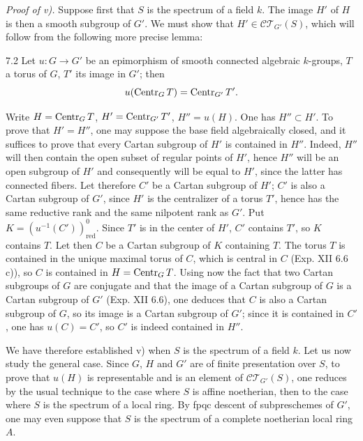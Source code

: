 \par\noindent\emph{Proof of v).}
Suppose first that $S$ is the spectrum of a field $k$. The image $H'$ of $H$ is then a smooth subgroup of $G'$. We must show that $H'\in\mathscr{CT}_{G'}(S)$, which will follow from the following more precise lemma:
\begin{lemma}{7.2}\label{XV.7.2}
Let $u:G\to G'$ be an epimorphism of smooth connected algebraic $k$-groups, $T$ a torus of $G$, $T'$ its image in $G'$; then
\[
u(\operatorname{Centr}_G T)=\operatorname{Centr}_{G'}T'.
\]
\end{lemma}
Write $H=\operatorname{Centr}_G T$, $H'=\operatorname{Centr}_{G'}T'$, $H''=u(H)$. One has $H''\subset H'$. To prove that $H'=H''$, one may suppose the base field algebraically closed, and it suffices to prove that every Cartan subgroup of $H'$ is contained in $H''$. Indeed, $H''$ will then contain the open subset of regular points of $H'$, hence $H''$ will be an open subgroup of $H'$ and consequently will be equal to $H'$, since the latter has connected fibers. Let therefore $C'$ be a Cartan subgroup of $H'$; $C'$ is also a Cartan subgroup of $G'$, since $H'$ is the centralizer of a torus $T'$, hence has the same reductive rank and the same nilpotent rank as $G'$. Put $K=(u^{-1}(C'))^0_{\mathrm{red}}$. Since $T'$ is in the center of $H'$, $C'$ contains $T'$, so $K$ contains $T$. Let then $C$ be a Cartan subgroup of $K$ containing $T$. The torus $T$ is contained in the unique maximal torus of $C$, which is central in $C$ (Exp. XII 6.6 c)), so $C$ is contained in $H=\operatorname{Centr}_G T$. Using now the fact that two Cartan subgroups of $G$ are conjugate and that the image of a Cartan subgroup of $G$ is a Cartan subgroup of $G'$ (Exp. XII 6.6), one deduces that $C$ is also a Cartan subgroup of $G$, so its image is a Cartan subgroup of $G'$; since it is contained in $C'$, one has $u(C)=C'$, so $C'$ is indeed contained in $H''$.

We have therefore established v) when $S$ is the spectrum of a field $k$. Let us now study the general case. Since $G$, $H$ and $G'$ are of finite presentation over $S$, to prove that $u(H)$ is representable and is an element of $\mathscr{CT}_{G'}(S)$, one reduces by the usual technique to the case where $S$ is affine noetherian, then to the case where $S$ is the spectrum of a local ring. By fpqc descent of subpreschemes of $G'$, one may even suppose that $S$ is the spectrum of a complete noetherian local ring $A$.

